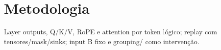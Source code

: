 \section{Metodologia}
Layer outputs, Q/K/V, RoPE e attention por token lógico; replay com tensores/mask/sinks; input B fixo e grouping/ como intervenção. 
